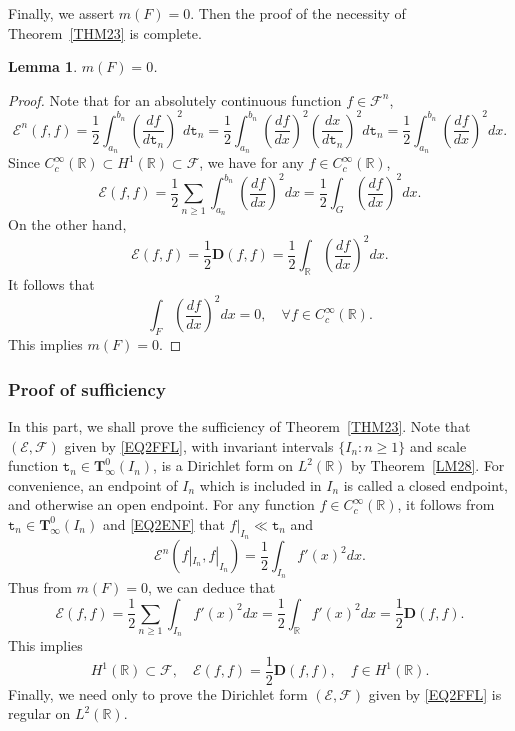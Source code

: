 \documentclass[a4paper]{amsart}
\newtheorem{lemma}[theorem]{Lemma}
\theoremstyle{definition}
\theoremstyle{remark}
\numberwithin{equation}{section}
\begin{document}
Finally, we assert $m(F)=0$. Then the proof of the necessity of Theorem~\ref{THM23} is complete.

\begin{lemma}
$m(F)=0$.
\end{lemma}
\begin{proof}
Note that for an absolutely continuous function $f\in {{\mathcal{F}}}^n$,
\begin{equation}\label{EQ2ENF}
	{{\mathcal{E}}}^n(f,f)=\frac{1}{2}\int_{a_n}^{b_n}\left(\frac{df}{d{{\mathtt{t}}}_n}\right)^2d{{\mathtt{t}}}_n= \frac{1}{2}\int_{a_n}^{b_n}\left(\frac{df}{dx}\right)^2\left(\frac{dx}{d{{\mathtt{t}}}_n}\right)^2d{{\mathtt{t}}}_n=\frac{1}{2}\int_{a_n}^{b_n}\left(\frac{df}{dx}\right)^2dx.
\end{equation}
Since $C_c^\infty(\mathbb{R})\subset H^1(\mathbb{R})\subset {{\mathcal{F}}}$, we have for any $f\in C_c^\infty(\mathbb{R})$,
\[
	{{\mathcal{E}}}(f,f)=\frac{1}{2}\sum_{n\geq 1} \int_{a_n}^{b_n} \left(\frac{df}{dx}\right)^2dx=\frac{1}{2}\int_G\left(\frac{df}{dx}\right)^2dx.
\]
On the other hand,
\[
	{{\mathcal{E}}}(f,f)=\frac{1}{2}\mathbf{D}(f,f)=\frac{1}{2}\int_\mathbb{R}\left(\frac{df}{dx}\right)^2dx.
	\]
It follows that
\[	
\int_F\left(\frac{df}{dx}\right)^2dx=0,\quad \forall f\in C_c^\infty(\mathbb{R}).
\]
This implies $m(F)=0$.
\end{proof}

\subsubsection{Proof of sufficiency}

In this part, we shall prove the sufficiency of Theorem~\ref{THM23}. Note that $({{\mathcal{E}}},{{\mathcal{F}}})$ given by \eqref{EQ2FFL}, with invariant intervals $\{I_n:n\ge 1\}$ and scale function ${{\mathtt{t}}}_n\in{{\mathbf{T}}}^0_\infty(I_n)$, is a Dirichlet form on $L^2(\mathbb{R})$ by Theorem~\ref{LM28}. For convenience, an endpoint of $I_n$ which is included in $I_n$ is called a closed endpoint, and otherwise an open endpoint.
For any function $f\in C_c^\infty(\mathbb{R})$, it follows from ${{\mathtt{t}}}_n\in {{\mathbf{T}}}^0_\infty(I_n)$ and \eqref{EQ2ENF} that $f|_{I_n}\ll {{\mathtt{t}}}_n$ and
\[
{{\mathcal{E}}}^n(f|_{I_n}, f|_{I_n})=\frac{1}{2}\int_{I_n} f'(x)^2dx.
\]
Thus from $m(F)=0$, we can deduce that
\[
	{{\mathcal{E}}}(f,f)=\frac{1}{2}\sum_{n\geq 1}\int_{I_n} f'(x)^2dx =\frac{1}{2}\int_\mathbb{R}f'(x)^2dx =\frac{1}{2}\mathbf{D}(f,f).
\]
This implies
\[
H^1(\mathbb{R})\subset {{\mathcal{F}}}, \quad {{\mathcal{E}}}(f,f)=\frac{1}{2}\mathbf{D}(f,f),\quad f\in H^1(\mathbb{R}).
\]
Finally, we need only to prove the Dirichlet form $({{\mathcal{E}}},{{\mathcal{F}}})$ given by \eqref{EQ2FFL} is regular on $L^2(\mathbb{R})$.
\end{document}
